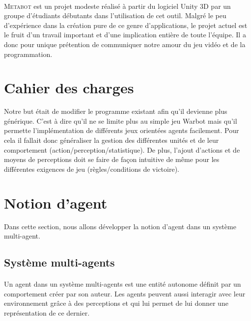 \documentclass{report}
\begin{document}
\paragraph{}
\textsc{Metabot} est un projet modeste réalisé à partir du logiciel Unity 3D par un groupe d'étudiants débutants dans l'utilisation de cet outil. Malgré le peu d'expérience dans la création pure de ce genre d'applications, le projet actuel est le fruit d'un travail important et d'une implication entière de toute l'équipe.
Il a donc pour unique prétention de communiquer notre amour du jeu vidéo et de la programmation.

\section{Cahier des charges}

Notre but était de modifier le programme existant afin qu'il devienne plus générique. C'est à dire qu'il ne se limite plus au simple jeu Warbot mais qu'il permette l'implémentation de différents jeux orientées agents facilement. 
Pour cela il fallait donc généraliser la gestion des différentes unités et de leur comportement (action/perception/statistique). De plus, l'ajout d'actions et de moyens de perceptions doit se faire de façon intuitive de même pour les différentes exigences de jeu (règles/conditions de victoire). 

\section{Notion d'agent}
Dans cette section, nous allons développer la notion d'agent dans un système multi-agent.
\subsection{Système multi-agents}
\paragraph{} Un agent dans un système multi-agents est une entité autonome définit par un comportement créer par son auteur. Les agents peuvent aussi interagir avec leur environnement grâce à des perceptions et qui lui permet de lui donner une représentation de ce dernier. 
\end{document}
